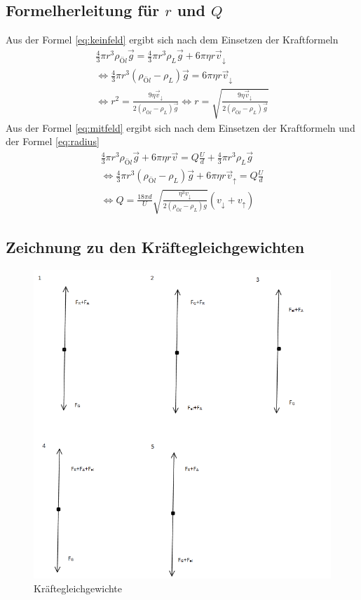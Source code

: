 \subsection{Formelherleitung für $r$ und $Q$}
Aus der Formel \ref{eq:keinfeld} ergibt sich nach dem Einsetzen der Kraftformeln
\begin{gather*}
\frac{4}{3}\pi r^3 \rho_{Öl}\vec{g}=\frac{4}{3}\pi r^3 \rho_{L}\vec{g}+6\pi \eta  r \vec{v}_{\downarrow}\\
\iff \frac{4}{3}\pi r^3 (\rho_{Öl}-\rho_{L})\vec{g}=6\pi \eta  r \vec{v}_{\downarrow}\\
\iff r^2=\frac{9\eta \vec{v}_{\downarrow}}{2(\rho_{Öl}-\rho_{L})\vec{g}}
\iff r=\sqrt{\frac{9\eta \vec{v}_{\downarrow}}{2(\rho_{Öl}-\rho_{L})\vec{g}}}
\end{gather*}
Aus der Formel \ref{eq:mitfeld} ergibt sich nach dem Einsetzen der Kraftformeln und der Formel \ref{eq:radius}
\begin{gather*}
\frac{4}{3}\pi r^3 \rho_{Öl}\vec{g}+6\pi \eta  r \vec{v}=Q\frac{U}{d}+\frac{4}{3}\pi r^3 \rho_{L}\vec{g}\\
\iff \frac{4}{3}\pi r^3 (\rho_{Öl}-\rho_{L})\vec{g}+6\pi \eta  r \vec{v}_{\uparrow}=Q\frac{U}{d}\\
\iff Q = \frac{18 \pi d}{U}\sqrt{\frac{\eta^3 v_{\downarrow}}{2(\rho_{Öl}-\rho_L)g}}(v_{\downarrow}+v_{\uparrow})
\end{gather*}
\subsection{Zeichnung zu den Kräftegleichgewichten}
\begin{figure}[h]
  \centering
  \includegraphics[width=1\textwidth]{kraftegleichgewichte.png}
  \caption{Kräftegleichgewichte}
  \label{fig:kraftegleich}
\end{figure}

